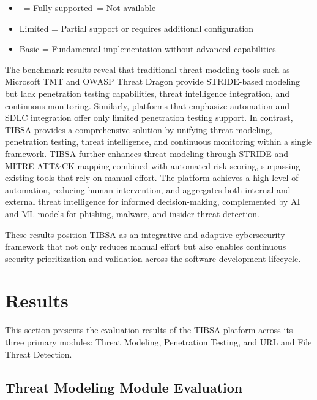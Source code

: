 \documentclass[12pt, a4paper]{article}
\newcommand{\cmark}{\checkmark}       %
\newcommand{\xmark}{\ding{55}}        %
\begin{document}
\begin{table}[H]
\vspace{0.5em}
\noindent\small
\begin{itemize}[nosep, leftmargin=*]
    \item \cmark\ = Fully supported\quad \xmark\ = Not available
    \item Limited = Partial support or requires additional configuration
    \item Basic = Fundamental implementation without advanced capabilities
\end{itemize}
\end{table}

The benchmark results reveal that traditional threat modeling tools such as Microsoft TMT and OWASP Threat Dragon provide STRIDE-based modeling but lack penetration testing capabilities, threat intelligence integration, and continuous monitoring. Similarly, platforms that emphasize automation and SDLC integration offer only limited penetration testing support. In contrast, TIBSA provides a comprehensive solution by unifying threat modeling, penetration testing, threat intelligence, and continuous monitoring within a single framework. TIBSA further enhances threat modeling through STRIDE and MITRE ATT\&CK mapping combined with automated risk scoring, surpassing existing tools that rely on manual effort. The platform achieves a high level of automation, reducing human intervention, and aggregates both internal and external threat intelligence for informed decision-making, complemented by AI and ML models for phishing, malware, and insider threat detection.

These results position TIBSA as an integrative and adaptive cybersecurity framework that not only reduces manual effort but also enables continuous security prioritization and validation across the software development lifecycle.

\section{Results}

This section presents the evaluation results of the TIBSA platform across its three primary modules: Threat Modeling, Penetration Testing, and URL and File Threat Detection.

\subsection{Threat Modeling Module Evaluation}
\end{document}
